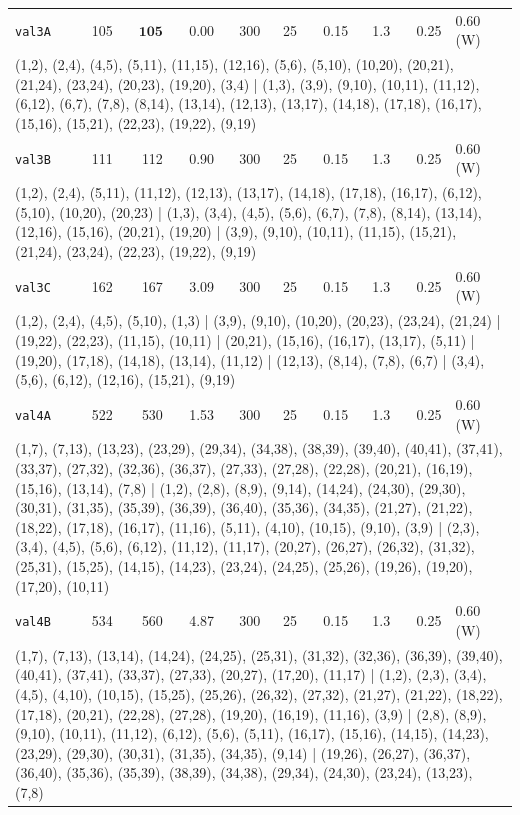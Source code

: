 \begin{longtable}{lrrrrrrrrl}
\texttt{val3A} & 105 & $\mathbf{105}$ & 0.00 & 300 & 25 & 0.15 & 1.3 & 0.25 & 0.60\,(W) \\
\multicolumn{10}{p{0.96\linewidth}}{\tiny\raggedright\arraybackslash (1,2), (2,4), (4,5), (5,11), (11,15), (12,16), (5,6), (5,10), (10,20), (20,21), (21,24), (23,24), (20,23), (19,20), (3,4) | (1,3), (3,9), (9,10), (10,11), (11,12), (6,12), (6,7), (7,8), (8,14), (13,14), (12,13), (13,17), (14,18), (17,18), (16,17), (15,16), (15,21), (22,23), (19,22), (9,19)} \\[2pt]
\texttt{val3B} & 111 & 112 & 0.90 & 300 & 25 & 0.15 & 1.3 & 0.25 & 0.60\,(W) \\
\multicolumn{10}{p{0.96\linewidth}}{\tiny\raggedright\arraybackslash (1,2), (2,4), (5,11), (11,12), (12,13), (13,17), (14,18), (17,18), (16,17), (6,12), (5,10), (10,20), (20,23) | (1,3), (3,4), (4,5), (5,6), (6,7), (7,8), (8,14), (13,14), (12,16), (15,16), (20,21), (19,20) | (3,9), (9,10), (10,11), (11,15), (15,21), (21,24), (23,24), (22,23), (19,22), (9,19)} \\[2pt]
\texttt{val3C} & 162 & 167 & 3.09 & 300 & 25 & 0.15 & 1.3 & 0.25 & 0.60\,(W) \\
\multicolumn{10}{p{0.96\linewidth}}{\tiny\raggedright\arraybackslash (1,2), (2,4), (4,5), (5,10), (1,3) | (3,9), (9,10), (10,20), (20,23), (23,24), (21,24) | (19,22), (22,23), (11,15), (10,11) | (20,21), (15,16), (16,17), (13,17), (5,11) | (19,20), (17,18), (14,18), (13,14), (11,12) | (12,13), (8,14), (7,8), (6,7) | (3,4), (5,6), (6,12), (12,16), (15,21), (9,19)} \\[2pt]
\texttt{val4A} & 522 & 530 & 1.53 & 300 & 25 & 0.15 & 1.3 & 0.25 & 0.60\,(W) \\
\multicolumn{10}{p{0.96\linewidth}}{\tiny\raggedright\arraybackslash (1,7), (7,13), (13,23), (23,29), (29,34), (34,38), (38,39), (39,40), (40,41), (37,41), (33,37), (27,32), (32,36), (36,37), (27,33), (27,28), (22,28), (20,21), (16,19), (15,16), (13,14), (7,8) | (1,2), (2,8), (8,9), (9,14), (14,24), (24,30), (29,30), (30,31), (31,35), (35,39), (36,39), (36,40), (35,36), (34,35), (21,27), (21,22), (18,22), (17,18), (16,17), (11,16), (5,11), (4,10), (10,15), (9,10), (3,9) | (2,3), (3,4), (4,5), (5,6), (6,12), (11,12), (11,17), (20,27), (26,27), (26,32), (31,32), (25,31), (15,25), (14,15), (14,23), (23,24), (24,25), (25,26), (19,26), (19,20), (17,20), (10,11)} \\[2pt]
\texttt{val4B} & 534 & 560 & 4.87 & 300 & 25 & 0.15 & 1.3 & 0.25 & 0.60\,(W) \\
\multicolumn{10}{p{0.96\linewidth}}{\tiny\raggedright\arraybackslash (1,7), (7,13), (13,14), (14,24), (24,25), (25,31), (31,32), (32,36), (36,39), (39,40), (40,41), (37,41), (33,37), (27,33), (20,27), (17,20), (11,17) | (1,2), (2,3), (3,4), (4,5), (4,10), (10,15), (15,25), (25,26), (26,32), (27,32), (21,27), (21,22), (18,22), (17,18), (20,21), (22,28), (27,28), (19,20), (16,19), (11,16), (3,9) | (2,8), (8,9), (9,10), (10,11), (11,12), (6,12), (5,6), (5,11), (16,17), (15,16), (14,15), (14,23), (23,29), (29,30), (30,31), (31,35), (34,35), (9,14) | (19,26), (26,27), (36,37), (36,40), (35,36), (35,39), (38,39), (34,38), (29,34), (24,30), (23,24), (13,23), (7,8)} \\[2pt]

\end{longtable}
